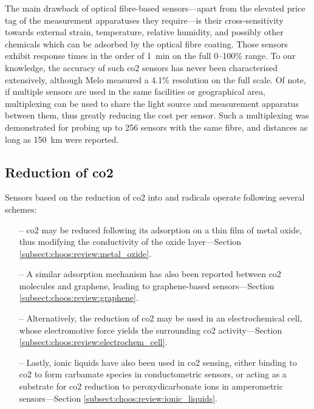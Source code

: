 The main drawback of optical fibre-based sensors---apart from the elevated price tag of the measurement apparatuses they require---is their cross-sensitivity towards external strain, temperature, relative humidity, and possibly other chemicals which can be adsorbed by the optical fibre coating. Those sensors exhibit response times in the order of 1~min on the full 0--100\% range\cite{barrington2018, chong2015}. To our knowledge, the accuracy of such \gls{co2} sensors has never been characterised extensively, although Melo \etal{}\cite{melo2014} measured a 4.1\% resolution on the full scale. Of note, if multiple sensors are used in the same facilities or geographical area, multiplexing can be used to share the light source and measurement apparatus between them, thus greatly reducing the cost per sensor\cite{kersey1993}. Such a multiplexing was demonstrated for probing up to 256 sensors with the same fibre, and distances as long as 150~km were reported\cite{perezherrera2013}.


\subsection{Reduction of \texorpdfstring{\gls{co2}}{CO2}}\label{subsect:choos:review:reduction}

Sensors based on the reduction of \gls{co2} into  and  radicals operate following several schemes:
\begin{itemize}
	\item[--] \gls{co2} may be reduced following its adsorption on a thin film of metal oxide, thus modifying the conductivity of the oxide layer---Section \ref{subsect:choos:review:metal_oxide}.
	\item[--] A similar adsorption mechanism has also been reported between \gls{co2} molecules and gra\-phene, leading to graphene-based sensors---Section \ref{subsect:choos:review:graphene}.
	\item[--] Alternatively, the reduction of \gls{co2} may be used in an electrochemical cell, whose electromotive force yields the surrounding \gls{co2} activity---Section \ref{subsect:choos:review:electrochem_cell}.
	\item[--] Lastly, ionic liquids have also been used in \gls{co2} sensing, either binding to \gls{co2} to form carbamate species in conductometric sensors, or acting as a substrate for \gls{co2} reduction to peroxydicarbonate ions in amperometric sensors---Section \ref{subsect:choos:review:ionic_liquids}.
\end{itemize}

